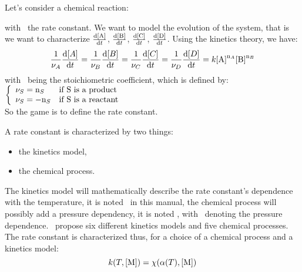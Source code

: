 Let's consider a chemical reaction:
\begin{chemicalEquation}
\label{youpa}
\end{chemicalEquation}
with \rcons\ the rate constant.
We want to model the evolution of the system, that is we want to
characterize 
$\doverdt{\conc[A]}$,
$\doverdt{\conc[B]}$,
$\doverdt{\conc[C]}$,
$\doverdt{\conc[D]}$.
Using the kinetics theory, we have:
\begin{equation}
\frac{1}{\scoef[A]}\doverdt{[A]} = 
\frac{1}{\scoef[B]}\doverdt{[B]} = 
\frac{1}{\scoef[C]}\doverdt{[C]} = 
\frac{1}{\scoef[D]}\doverdt{[D]} = 
\rcons\conc[A]^{\scoefabs[A]}\conc[B]^{\scoefabs[B]}
\end{equation}
with \scoef[A]\ being the stoichiometric coefficient, which is defined by:\\
$\left\{\begin{array}{ll}
\scoef[S] = \scoefabs[S] & \text{if \ce{S} is a product} \\
\scoef[S] = -\scoefabs[S] & \text{if \ce{S} is a reactant} \\
\end{array}\right.$\\
So the game is to define the rate constant. 

A rate constant is characterized by two things:
\begin{itemize}
\item the kinetics model,
\item the chemical process.
\end{itemize}
The kinetics model will mathematically describe the rate constant's dependence with
the temperature, it is noted \kinMod\ in this manual, the chemical process will
possibly add a pressure dependency, it is noted \chemProc, with \conc[M]\
denoting the pressure dependence.
\antioch\ propose six different kinetics models and five chemical processes.
The rate constant is characterized thus, for a choice of a chemical process and
a kinetics model:
\begin{equation}
\rateCons = \chemProc
\end{equation}

